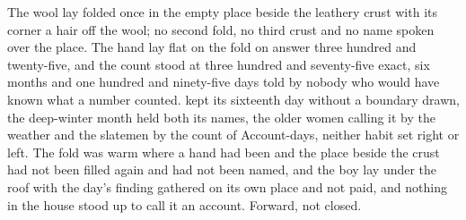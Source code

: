 The wool lay folded once in the empty place beside the leathery crust with its corner a hair off the wool; no second fold, no third crust and no name spoken over the place. The hand lay flat on the fold on answer three hundred and twenty-five, and the count stood at three hundred and seventy-five exact, six months and one hundred and ninety-five days told by nobody who would have known what a number counted.  kept its sixteenth day without a boundary drawn, the deep-winter month held both its names, the older women calling it by the weather and the slatemen by the count of Account-days, neither habit set right or left. The fold was warm where a hand had been and the place beside the crust had not been filled again and had not been named, and the boy lay under the roof with the day's finding gathered on its own place and not paid, and nothing in the house stood up to call it an account. Forward, not closed.
